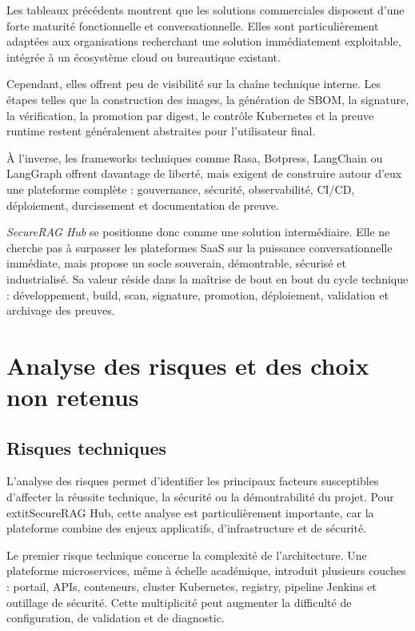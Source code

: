 Les tableaux précédents montrent que les solutions commerciales disposent d’une forte maturité fonctionnelle et conversationnelle. Elles sont particulièrement adaptées aux organisations recherchant une solution immédiatement exploitable, intégrée à un écosystème cloud ou bureautique existant.

Cependant, elles offrent peu de visibilité sur la chaîne technique interne. Les étapes telles que la construction des images, la génération de SBOM, la signature, la vérification, la promotion par digest, le contrôle Kubernetes et la preuve runtime restent généralement abstraites pour l’utilisateur final.

À l’inverse, les frameworks techniques comme Rasa, Botpress, LangChain ou LangGraph offrent davantage de liberté, mais exigent de construire autour d’eux une plateforme complète : gouvernance, sécurité, observabilité, CI/CD, déploiement, durcissement et documentation de preuve.

\textit{SecureRAG Hub} se positionne donc comme une solution intermédiaire. Elle ne cherche pas à surpasser les plateformes SaaS sur la puissance conversationnelle immédiate, mais propose un socle souverain, démontrable, sécurisé et industrialisé. Sa valeur réside dans la maîtrise de bout en bout du cycle technique : développement, build, scan, signature, promotion, déploiement, validation et archivage des preuves.
\section{Analyse des risques et des choix non retenus}

\subsection{Risques techniques}

L’analyse des risques permet d’identifier les principaux facteurs susceptibles d’affecter la réussite technique, la sécurité ou la démontrabilité du projet. Pour 	extit{SecureRAG Hub}, cette analyse est particulièrement importante, car la plateforme combine des enjeux applicatifs, d’infrastructure et de sécurité.

Le premier risque technique concerne la complexité de l’architecture. Une plateforme microservices, même à échelle académique, introduit plusieurs couches : portail, APIs, conteneurs, cluster Kubernetes, registry, pipeline Jenkins et outillage de sécurité. Cette multiplicité peut augmenter la difficulté de configuration, de validation et de diagnostic.

